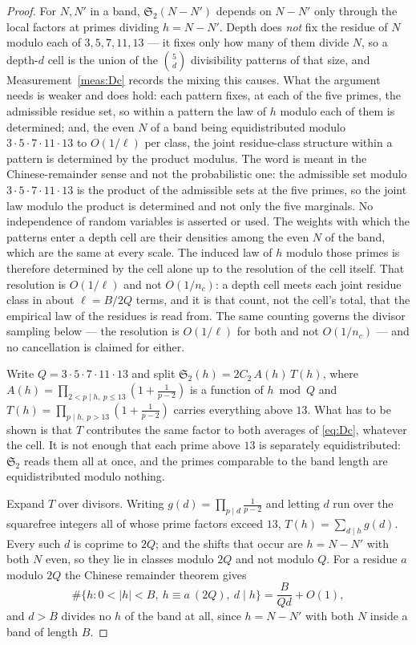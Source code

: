 \documentclass[11pt,a4paper]{article}
\theoremstyle{plain}
\theoremstyle{definition}
\theoremstyle{remark}
\renewcommand{\SS}{\mathfrak{S}}
\begin{document}
\begin{proof}
For $N,N'$ in a band, $\SS_2(N-N')$ depends on $N-N'$ only through the
local factors at primes dividing $h=N-N'$. Depth does \emph{not} fix
the residue of $N$ modulo each of $3,5,7,11,13$ --- it fixes only how
many of them divide $N$, so a depth-$d$ cell is the union of the
$\binom{5}{d}$ divisibility patterns of that size, and
Measurement~\ref{meas:Dc} records the mixing this causes. What the
argument needs is weaker and does hold: each pattern fixes, at each of
the five primes, the admissible residue set, so within a pattern the
law of $h$ modulo each of them is determined; and, the even $N$ of a
band being equidistributed modulo $3\cdot5\cdot7\cdot11\cdot13$ to
$O(1/\ell)$ per class, the joint residue-class structure within a
pattern is determined by the product modulus. The word is meant in the
Chinese-remainder sense and not the probabilistic one: the admissible
set modulo $3\cdot5\cdot7\cdot11\cdot13$ is the product of the
admissible sets at the five primes, so the joint law modulo the product
is determined and not only the five marginals. No independence of
random variables is asserted or used. The weights with
which the patterns enter a depth cell are their densities among the
even $N$ of the band, which are the same at every scale. The induced
law of $h$ modulo those primes is therefore determined by the cell
alone up to the resolution of the cell itself. That resolution is
$O(1/\ell)$ and not $O(1/n_c)$: a depth cell meets each joint residue
class in about $\ell=B/2Q$ terms, and it is that count, not the cell's
total, that the empirical law of the residues is read from. The same
counting governs the divisor sampling below --- the resolution is
$O(1/\ell)$ for both and not $O(1/n_c)$ --- and no cancellation is
claimed for either.

Write $Q=3\cdot5\cdot7\cdot11\cdot13$ and split
$\SS_2(h)=2C_2\,A(h)\,T(h)$, where
$A(h)=\prod_{2<p\mid h,\ p\le13}(1+\frac1{p-2})$ is a function of
$h\bmod Q$ and $T(h)=\prod_{p\mid h,\ p>13}(1+\frac1{p-2})$ carries
everything above $13$. What has to be shown is that $T$ contributes
the same factor to both averages of \eqref{eq:Dc}, whatever the cell.
It is not enough that each prime above $13$ is separately
equidistributed: $\SS_2$ reads them all at once, and the primes
comparable to the band length are equidistributed modulo nothing.

Expand $T$ over divisors. Writing $g(d)=\prod_{p\mid d}\frac1{p-2}$
and letting $d$ run over the squarefree integers all of whose prime
factors exceed $13$, $T(h)=\sum_{d\mid h}g(d)$. Every such $d$ is
coprime to $2Q$; and the shifts that occur are $h=N-N'$ with both $N$
even, so they lie in classes modulo $2Q$ and not modulo $Q$. For a
residue $a$ modulo $2Q$ the Chinese remainder theorem gives
\[
  \#\{h:0<|h|<B,\ h\equiv a\ (2Q),\ d\mid h\}
  =\frac{B}{Qd}+O(1),
\]
and $d>B$ divides no $h$ of the band at all, since $h=N-N'$ with both
$N$ inside a band of length $B$.


\end{proof}
\end{document}
